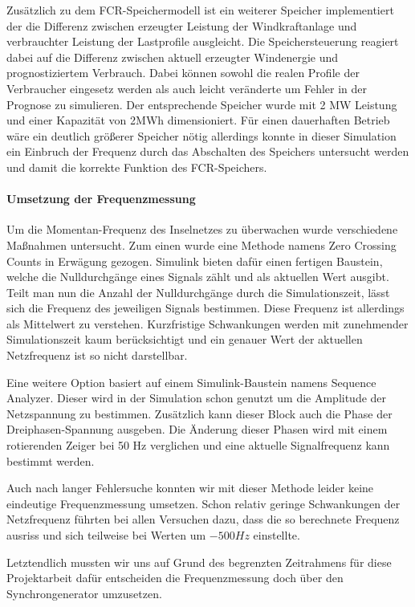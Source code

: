 Zusätzlich zu dem FCR-Speichermodell ist ein weiterer Speicher implementiert der die Differenz zwischen erzeugter 
Leistung der Windkraftanlage und verbrauchter Leistung der Lastprofile ausgleicht.
Die Speichersteuerung reagiert dabei auf die Differenz zwischen aktuell erzeugter Windenergie und prognostiziertem Verbrauch.
Dabei können sowohl die realen Profile der Verbraucher eingesetz werden als auch leicht veränderte um Fehler in der Prognose zu simulieren.
Der entsprechende Speicher wurde mit 2 MW Leistung und einer Kapazität von 2MWh dimensioniert.
Für einen dauerhaften Betrieb wäre ein deutlich größerer Speicher nötig allerdings konnte in dieser Simulation
ein Einbruch der Frequenz durch das Abschalten des Speichers untersucht werden und damit die korrekte Funktion des FCR-Speichers.

\paragraph{Umsetzung der Frequenzmessung}
Um die Momentan-Frequenz des Inselnetzes zu überwachen wurde verschiedene Maßnahmen untersucht.
Zum einen wurde eine Methode namens Zero Crossing Counts in Erwägung gezogen.
Simulink bieten dafür einen fertigen Baustein, welche die Nulldurchgänge eines Signals zählt und als aktuellen Wert ausgibt.
Teilt man nun die Anzahl der Nulldurchgänge durch die Simulationszeit, lässt sich die Frequenz des jeweiligen Signals bestimmen.
Diese Frequenz ist allerdings als Mittelwert zu verstehen.
Kurzfristige Schwankungen werden mit zunehmender Simulationszeit kaum berücksichtigt und ein genauer Wert der aktuellen
Netzfrequenz ist so nicht darstellbar.

Eine weitere Option basiert auf einem Simulink-Baustein namens Sequence Analyzer. 
Dieser wird in der Simulation schon genutzt um die Amplitude der Netzspannung zu bestimmen.
Zusätzlich kann dieser Block auch die Phase der Dreiphasen-Spannung ausgeben.
Die Änderung dieser Phasen wird mit einem rotierenden Zeiger bei 50 Hz verglichen und eine aktuelle Signalfrequenz kann bestimmt werden.

Auch nach langer Fehlersuche konnten wir mit dieser Methode leider keine eindeutige Frequenzmessung umsetzen.
Schon relativ geringe Schwankungen der Netzfrequenz führten bei allen Versuchen dazu, dass die so berechnete Frequenz
ausriss und sich teilweise bei Werten um $-500 Hz$ einstellte.

Letztendlich mussten wir uns auf Grund des begrenzten Zeitrahmens für diese Projektarbeit dafür entscheiden die Frequenzmessung
doch über den Synchrongenerator umzusetzen.

